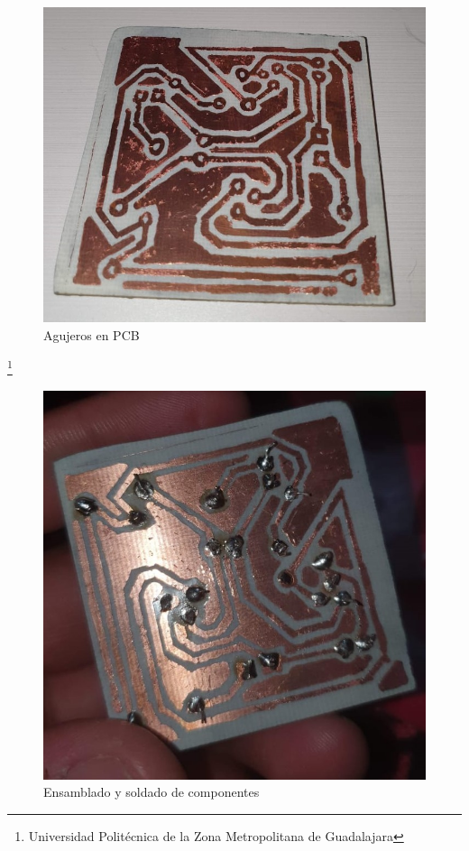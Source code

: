 \documentclass[11pt,a4paper]{article}
\begin{document}
\begin{figure}[hbtp]
\centering
\includegraphics[scale=0.4]{Pictures/PCB1.jpeg}
\caption{Agujeros en PCB}
\end{figure}

\footnote{Universidad Politécnica de la Zona Metropolitana de Guadalajara}

\newpage
\begin{figure}[hbtp]
\centering
\includegraphics[scale=0.4]{Pictures/PCB2.jpeg}
\caption{Ensamblado y soldado de componentes}
\end{figure}
\end{document}
